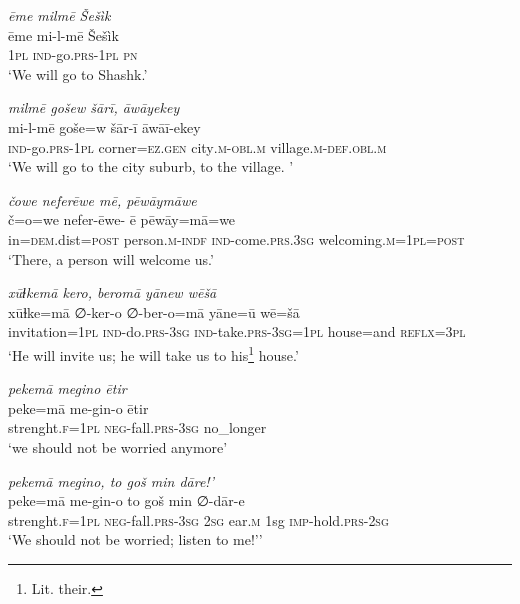\ea \label{HB.32}
\textit{ēme milmē Šešìk} \\ 
\gll ēme mi-l-mē Šešìk \\ 
 \textsc{1pl} \textsc{ind-}go\textsc{.prs}\textsc{-1pl} \textsc{pn} \\ 
\glt `We will go to Shashk.'
\z 
 
\ea \label{HB.33}
\textit{milmē gošew šārī, āwāyekey} \\ 
\gll mi-l-mē goše=w šār-ī āwāī-ekey \\ 
 \textsc{ind-}go\textsc{.prs}\textsc{-1pl} corner\textsc{=ez}\textsc{.gen} city\textsc{.m}\textsc{-obl}\textsc{.m} village\textsc{.m}\textsc{-def}\textsc{.obl}\textsc{.m} \\ 
\glt `We will go to the city suburb, to the village. '
\z 
 
\ea \label{HB.34}
\textit{čowe neferēwe mē, pēwāymāwe} \\ 
\gll č=o=we nefer-ēwe- ē pēwāy=mā=we \\ 
 in\textsc{=dem}.dist\textsc{=\textsc{post}} person\textsc{.m}\textsc{-indf} \textsc{ind-}come\textsc{.prs}\textsc{.3sg} welcoming\textsc{.m}\textsc{=1pl}\textsc{=\textsc{post}} \\ 
\glt `There, a person will welcome us.'
\z 
 
\ea \label{HB.35}
\textit{xūɫkemā kero, beromā yānew wēšā} \\ 
\gll xūɫke=mā ∅-ker-o ∅-ber-o=mā yāne=ū wē=šā \\ 
 invitation\textsc{=1pl} \textsc{ind-}do\textsc{.prs}\textsc{-3sg} \textsc{ind-}take\textsc{.prs}\textsc{-3sg}\textsc{=1pl} house=and \textsc{reflx}\textsc{=3pl} \\ 
\glt `He will invite us; he will take us to his\footnote{Lit. their.} house.'
\z 
 
\ea \label{HB.42}
\textit{pekemā megino ētir} \\ 
\gll peke=mā me-gin-o ētir \\ 
 strenght\textsc{\textsc{.f}}\textsc{=1pl} \textsc{neg-}fall\textsc{.prs}\textsc{-3sg} no\_longer \\ 
\glt `we should not be worried anymore'
\z 
 
\ea \label{HB.43}
\textit{pekemā megino, to goš min dāre!’} \\ 
\gll peke=mā me-gin-o to goš min ∅-dār-e \\ 
 strenght\textsc{\textsc{.f}}\textsc{=1pl} \textsc{neg-}fall\textsc{.prs}\textsc{-3sg} \textsc{2sg} ear\textsc{.m} 1sg \textsc{imp-}hold\textsc{.prs}-\textsc{2sg} \\ 
\glt `We should not be worried; listen to me!’'
\z 
 
